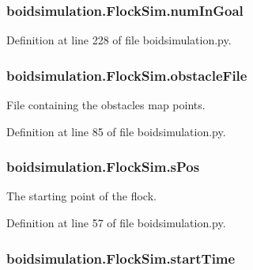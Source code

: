 \hypertarget{classboidsimulation_1_1FlockSim_ae60982002b6c8c922b3822dbdec4bd41}{
\subsubsection[{num\-In\-Goal}]{\setlength{\rightskip}{0pt plus 5cm}boidsimulation.\-Flock\-Sim.\-num\-In\-Goal}}\label{classboidsimulation_1_1FlockSim_ae60982002b6c8c922b3822dbdec4bd41}


Definition at line 228 of file boidsimulation.\-py.

\hypertarget{classboidsimulation_1_1FlockSim_afddb603ed211f698d97b7265bcad0cef}{
\subsubsection[{obstacle\-File}]{\setlength{\rightskip}{0pt plus 5cm}boidsimulation.\-Flock\-Sim.\-obstacle\-File}}\label{classboidsimulation_1_1FlockSim_afddb603ed211f698d97b7265bcad0cef}


File containing the obstacles map points. 



Definition at line 85 of file boidsimulation.\-py.

\hypertarget{classboidsimulation_1_1FlockSim_a1658c675990b8bdb3955cae1b7292b38}{
\subsubsection[{s\-Pos}]{\setlength{\rightskip}{0pt plus 5cm}boidsimulation.\-Flock\-Sim.\-s\-Pos}}\label{classboidsimulation_1_1FlockSim_a1658c675990b8bdb3955cae1b7292b38}


The starting point of the flock. 



Definition at line 57 of file boidsimulation.\-py.

\hypertarget{classboidsimulation_1_1FlockSim_aea78473e0e592e48b6047f49f8254cc1}{
\subsubsection[{start\-Time}]{\setlength{\rightskip}{0pt plus 5cm}boidsimulation.\-Flock\-Sim.\-start\-Time}}\label{classboidsimulation_1_1FlockSim_aea78473e0e592e48b6047f49f8254cc1}


